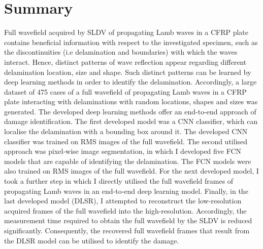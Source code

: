 \section{Summary}
\label{sec46}
Full wavefield acquired by SLDV of propagating Lamb waves in a CFRP plate contains beneficial information with respect to the investigated specimen, such as the discontinuities (i.e delamination and boundaries) with which the waves interact.
Hence, distinct patterns of wave reflection appear regarding different delamination location, size and shape.
Such distinct patterns can be learned by deep learning methods in order to identify the delamination.
Accordingly, a large dataset of 475 cases of a full wavefield of propagating Lamb waves in a CFRP plate interacting with delaminations with random locations, shapes and sizes was generated.
The developed deep learning methods offer an end-to-end approach of damage identification.
The first developed model was a CNN classifier, which can localise the delamination with a bounding box around it.
The developed CNN classifier was trained on RMS images of the full wavefield.
The second utilised approach was pixel-wise image segmentation, in which I developed five FCN models that are capable of identifying the delamination.
The FCN models were also trained on RMS images of the full wavefield.
For the next developed model, I took a further step in which I directly utilised the full wavefield frames of propagating Lamb waves in an end-to-end deep learning model. 
Finally, in the last developed model (DLSR), I attempted to reconstruct the low-resolution acquired frames of the full wavefield into the high-resolution.
Accordingly, the measurement time required to obtain the full wavefield by the SLDV is reduced significantly.
Consequently, the recovered full wavefield frames that result from the DLSR model can be utilised to identify the damage.